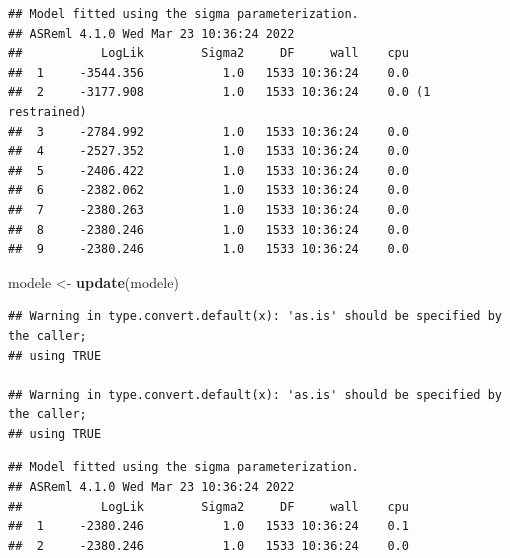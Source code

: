 \documentclass[
  12pt,
]{book}
\newenvironment{Shaded}{\begin{snugshade}}{\end{snugshade}}
\newcommand{\KeywordTok}[1]{\textcolor[rgb]{0.13,0.29,0.53}{\textbf{#1}}}
\newcommand{\NormalTok}[1]{#1}
\newcommand{\OperatorTok}[1]{\textcolor[rgb]{0.81,0.36,0.00}{\textbf{#1}}}
\newcommand{\StringTok}[1]{\textcolor[rgb]{0.31,0.60,0.02}{#1}}
\begin{document}
\begin{verbatim}
## Model fitted using the sigma parameterization.
## ASReml 4.1.0 Wed Mar 23 10:36:24 2022
##           LogLik        Sigma2     DF     wall    cpu
##  1     -3544.356           1.0   1533 10:36:24    0.0
##  2     -3177.908           1.0   1533 10:36:24    0.0 (1 restrained)
##  3     -2784.992           1.0   1533 10:36:24    0.0
##  4     -2527.352           1.0   1533 10:36:24    0.0
##  5     -2406.422           1.0   1533 10:36:24    0.0
##  6     -2382.062           1.0   1533 10:36:24    0.0
##  7     -2380.263           1.0   1533 10:36:24    0.0
##  8     -2380.246           1.0   1533 10:36:24    0.0
##  9     -2380.246           1.0   1533 10:36:24    0.0
\end{verbatim}

\begin{Shaded}
\begin{Highlighting}[]
\NormalTok{modele \textless{}{-}}\StringTok{ }\KeywordTok{update}\NormalTok{(modele)}
\end{Highlighting}
\end{Shaded}

\begin{verbatim}
## Warning in type.convert.default(x): 'as.is' should be specified by the caller;
## using TRUE

## Warning in type.convert.default(x): 'as.is' should be specified by the caller;
## using TRUE
\end{verbatim}

\begin{verbatim}
## Model fitted using the sigma parameterization.
## ASReml 4.1.0 Wed Mar 23 10:36:24 2022
##           LogLik        Sigma2     DF     wall    cpu
##  1     -2380.246           1.0   1533 10:36:24    0.1
##  2     -2380.246           1.0   1533 10:36:24    0.0
\end{verbatim}

\begin{Shaded}
\end{Shaded}
\end{document}
